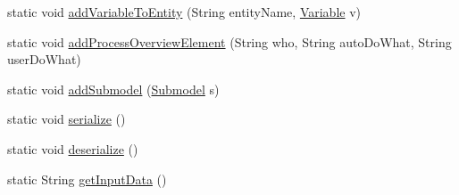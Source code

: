 \begin{DoxyCompactItemize}
\item 
static void \hyperlink{classit_1_1isislab_1_1masonhelperdocumentation_1_1_o_d_d_1_1_o_d_d_a9d1874e3743fd5d21e3fae7d29e6bc46}{add\-Variable\-To\-Entity} (String entity\-Name, \hyperlink{classit_1_1isislab_1_1masonhelperdocumentation_1_1_o_d_d_1_1_variable}{Variable} v)
\item 
static void \hyperlink{classit_1_1isislab_1_1masonhelperdocumentation_1_1_o_d_d_1_1_o_d_d_a7b9826b7f99bd700f672b5ab99d78d92}{add\-Process\-Overview\-Element} (String who, String auto\-Do\-What, String user\-Do\-What)
\item 
static void \hyperlink{classit_1_1isislab_1_1masonhelperdocumentation_1_1_o_d_d_1_1_o_d_d_af9cc8ffb7e84f92dd1d878d29d66800e}{add\-Submodel} (\hyperlink{classit_1_1isislab_1_1masonhelperdocumentation_1_1_o_d_d_1_1_submodel}{Submodel} s)
\item 
static void \hyperlink{classit_1_1isislab_1_1masonhelperdocumentation_1_1_o_d_d_1_1_o_d_d_aff5e4d3b97260b59285382208c905f68}{serialize} ()
\item 
static void \hyperlink{classit_1_1isislab_1_1masonhelperdocumentation_1_1_o_d_d_1_1_o_d_d_aef969a9a32bbae5c690470582581220e}{deserialize} ()
\item 
static String \hyperlink{classit_1_1isislab_1_1masonhelperdocumentation_1_1_o_d_d_1_1_o_d_d_adf8e82ba7854afdc0790d3b3032b930c}{get\-Input\-Data} ()
\end{DoxyCompactItemize}
